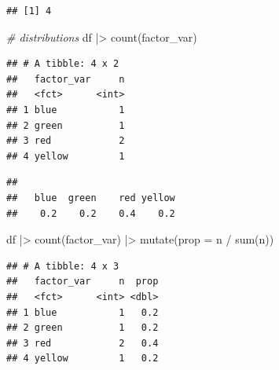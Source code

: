 \documentclass[
  12pt,
  oneside]{book}
\newenvironment{Shaded}{\begin{snugshade}}{\end{snugshade}}
\newcommand{\AttributeTok}[1]{\textcolor[rgb]{0.77,0.63,0.00}{#1}}
\newcommand{\CommentTok}[1]{\textcolor[rgb]{0.56,0.35,0.01}{\textit{#1}}}
\newcommand{\FunctionTok}[1]{\textcolor[rgb]{0.00,0.00,0.00}{#1}}
\newcommand{\NormalTok}[1]{#1}
\newcommand{\SpecialCharTok}[1]{\textcolor[rgb]{0.00,0.00,0.00}{#1}}
\theoremstyle{definition}
\theoremstyle{definition}
\theoremstyle{definition}
\theoremstyle{definition}
\theoremstyle{remark}
\begin{document}
\begin{Shaded}
\end{Shaded}

\begin{verbatim}
## [1] 4
\end{verbatim}

\begin{Shaded}
\begin{Highlighting}[]
\CommentTok{\# distributions}
\NormalTok{df }\SpecialCharTok{|\textgreater{}} \FunctionTok{count}\NormalTok{(factor\_var)}
\end{Highlighting}
\end{Shaded}

\begin{verbatim}
## # A tibble: 4 x 2
##   factor_var     n
##   <fct>      <int>
## 1 blue           1
## 2 green          1
## 3 red            2
## 4 yellow         1
\end{verbatim}

\begin{Shaded}
\end{Shaded}

\begin{verbatim}
## 
##   blue  green    red yellow 
##    0.2    0.2    0.4    0.2
\end{verbatim}

\begin{Shaded}
\begin{Highlighting}[]
\NormalTok{df }\SpecialCharTok{|\textgreater{}} 
  \FunctionTok{count}\NormalTok{(factor\_var) }\SpecialCharTok{|\textgreater{}} 
  \FunctionTok{mutate}\NormalTok{(}\AttributeTok{prop =}\NormalTok{ n }\SpecialCharTok{/} \FunctionTok{sum}\NormalTok{(n))}
\end{Highlighting}
\end{Shaded}

\begin{verbatim}
## # A tibble: 4 x 3
##   factor_var     n  prop
##   <fct>      <int> <dbl>
## 1 blue           1   0.2
## 2 green          1   0.2
## 3 red            2   0.4
## 4 yellow         1   0.2
\end{verbatim}
\end{document}
